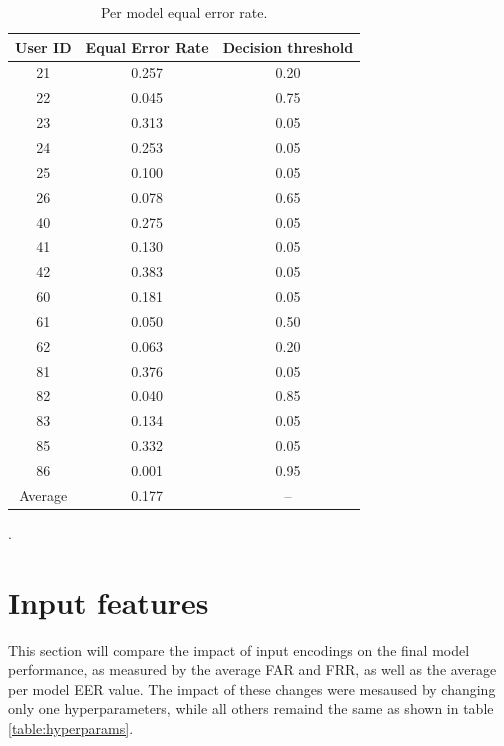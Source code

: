 \begin{center}
	\begin{table}[H]
		\begin{center}
			\begin{tabular}{ |c|c|c| } 
				\hline
				User ID & Equal Error Rate & Decision threshold \\
				\hline
				21 & 0.257 & 0.20 \\
				\hline
				22 & 0.045 & 0.75 \\
				\hline
				23 & 0.313 & 0.05 \\
				\hline
				24 & 0.253 & 0.05 \\
				\hline
				25 & 0.100 & 0.05 \\
				\hline
				26 & 0.078 & 0.65 \\
				\hline
				40 & 0.275 & 0.05 \\
				\hline
				41 & 0.130 & 0.05 \\
				\hline
				42 & 0.383 & 0.05 \\
				\hline
				60 & 0.181 & 0.05 \\
				\hline
				61 & 0.050 & 0.50 \\
				\hline
				62 & 0.063 & 0.20 \\
				\hline
				81 & 0.376 & 0.05 \\
				\hline
				82 & 0.040 & 0.85 \\
				\hline
				83 & 0.134 & 0.05 \\
				\hline
				85 & 0.332 & 0.05 \\
				\hline
				86 & 0.001 & 0.95 \\
				\hline
				\hline
				Average & 0.177 & -- \\
				\hline
			\end{tabular}
		\end{center}
		\caption{Per model equal error rate.}
		\label{table:EER_separate}
	\end{table}
\end{center}

.


\section{Input features}
This section will compare the impact of input encodings on the final model performance, as measured by the average FAR and FRR, as well as the average per model EER value. The impact of these changes were mesaused by changing only one hyperparameters, while all others remaind the same as shown in table \ref{table:hyperparams}.

